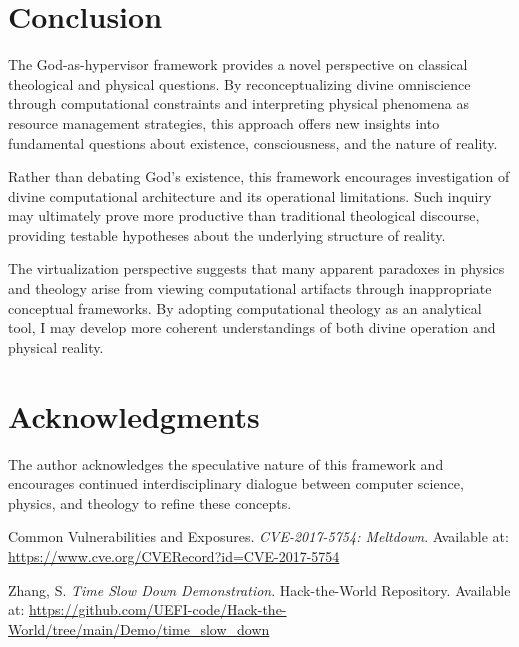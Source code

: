 \documentclass[12pt,a4paper]{article}
\begin{document}
\section{Conclusion}

The God-as-hypervisor framework provides a novel perspective on classical theological and physical questions. By reconceptualizing divine omniscience through computational constraints and interpreting physical phenomena as resource management strategies, this approach offers new insights into fundamental questions about existence, consciousness, and the nature of reality.

Rather than debating God's existence, this framework encourages investigation of divine computational architecture and its operational limitations. Such inquiry may ultimately prove more productive than traditional theological discourse, providing testable hypotheses about the underlying structure of reality.

The virtualization perspective suggests that many apparent paradoxes in physics and theology arise from viewing computational artifacts through inappropriate conceptual frameworks. By adopting computational theology as an analytical tool, I may develop more coherent understandings of both divine operation and physical reality.

\section*{Acknowledgments}

The author acknowledges the speculative nature of this framework and encourages continued interdisciplinary dialogue between computer science, physics, and theology to refine these concepts.

\begin{thebibliography}{9}

Common Vulnerabilities and Exposures.
\textit{CVE-2017-5754: Meltdown}.
Available at: \url{https://www.cve.org/CVERecord?id=CVE-2017-5754}

Zhang, S.
\textit{Time Slow Down Demonstration}.
Hack-the-World Repository.
Available at: \url{https://github.com/UEFI-code/Hack-the-World/tree/main/Demo/time_slow_down}

\end{thebibliography}


\end{document}

